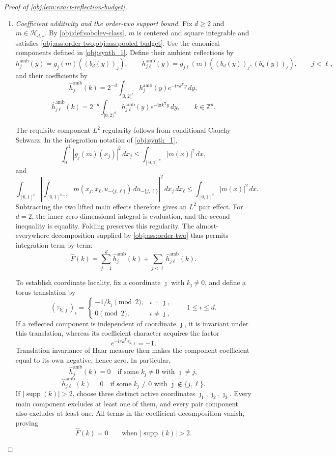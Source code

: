 \begin{proof}[Proof of \cref{obj:lem:exact-reflection-budget}]
\begin{enumerate}
\item \textit{Coefficient additivity and the order-two support bound.}
Fix \(d\geq2\) and \(m\in\mathcal H_{d,s}\). By \cref{obj:def:sobolev-class}, \(m\) is centered and square integrable and satisfies \cref{obj:ass:order-two,obj:ass:pooled-budget}. Use the canonical components defined in \cref{obj:synth_1}. Define their ambient reflections by
\[
h_j^{\mathrm{amb}}(y)
=
g_j(m)((b_d(y))_j),
\qquad
h_{j\ell}^{\mathrm{amb}}(y)
=
g_{j\ell}(m)((b_d(y))_j,(b_d(y))_\ell),
\qquad j<\ell,
\]
and their coefficients by
\[
\widehat h_j^{\mathrm{amb}}(k)
=
2^{-d}\int_{[0,2)^d}
h_j^{\mathrm{amb}}(y)e^{-\mathrm i\pi k^{\mathsf T}y}\,dy,
\]
\[
\widehat h_{j\ell}^{\mathrm{amb}}(k)
=
2^{-d}\int_{[0,2)^d}
h_{j\ell}^{\mathrm{amb}}(y)e^{-\mathrm i\pi k^{\mathsf T}y}\,dy,
\qquad k\in\mathbb Z^d.
\]

The requisite component \(L^2\) regularity follows from conditional Cauchy--Schwarz. In the integration notation of \cref{obj:synth_1},
\[
\int_0^1|g_j(m)(x_j)|^2\,dx_j
\leq
\int_{[0,1]^d}|m(x)|^2\,dx,
\]
and
\[
\int_{[0,1]^2}
\left|
\int_{[0,1]^{d-2}}
m(x_j,x_\ell,u_{-\{j,\ell\}})\,du_{-\{j,\ell\}}
\right|^2\,dx_j\,dx_\ell
\leq
\int_{[0,1]^d}|m(x)|^2\,dx.
\]
Subtracting the two lifted main effects therefore gives an \(L^2\) pair effect. For \(d=2\), the inner zero-dimensional integral is evaluation, and the second inequality is equality. Folding preserves this regularity. The almost-everywhere decomposition supplied by \cref{obj:ass:order-two} thus permits integration term by term:
\[
\widehat F(k)
=
\sum_{j=1}^d\widehat h_j^{\mathrm{amb}}(k)
+
\sum_{j<\ell}\widehat h_{j\ell}^{\mathrm{amb}}(k).
\]

To establish coordinate locality, fix a coordinate \(\jmath\) with
\(k_\jmath\neq0\), and define a torus translation by
\[
(\tau_{k,\jmath})_\iota
=
\begin{cases}
-1/k_\jmath\pmod{2},&\iota=\jmath,\\
0\pmod{2},&\iota\neq\jmath,
\end{cases}
\qquad 1\leq\iota\leq d.
\]
If a reflected component is independent of coordinate \(\jmath\), it is invariant under this translation, whereas its coefficient character acquires the factor
\[
e^{-\mathrm i\pi k^{\mathsf T}\tau_{k,\jmath}}=-1.
\]
Translation invariance of Haar measure then makes the component coefficient equal to its own negative, hence zero. In particular,
\[
\widehat h_j^{\mathrm{amb}}(k)=0
\quad\text{if some }k_\jmath\neq0\text{ with }\jmath\neq j,
\]
\[
\widehat h_{j\ell}^{\mathrm{amb}}(k)=0
\quad\text{if some }k_\jmath\neq0\text{ with }\jmath\notin\{j,\ell\}.
\]
If \(|\operatorname{supp}(k)|>2\), choose three distinct active coordinates
\(\jmath_1,\jmath_2,\jmath_3\). Every main component excludes at least one of them, and every pair component also excludes at least one. All terms in the coefficient decomposition vanish, proving
\[
\widehat F(k)=0
\qquad\text{when }|\operatorname{supp}(k)|>2.
\]


\end{enumerate}
\end{proof}
